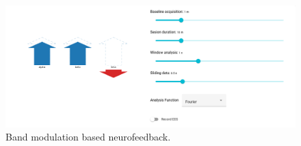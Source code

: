 \begin{figure}[H]
\begin{centering}
% 
\includegraphics[width=1\textwidth]{Appendix/paradigms/Figures/band-neurofeedback.png}
\par\end{centering}
\caption{Band modulation based neurofeedback.}
\label{}
\end{figure}